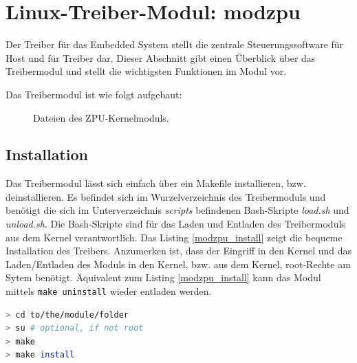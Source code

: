 \documentclass[11pt]{scrartcl}
\begin{document}
\pagebreak
\section{Linux-Treiber-Modul: modzpu}
Der Treiber für das Embedded System stellt die zentrale Steuerungssoftware für Host und für Treiber dar. Dieser Abschnitt gibt einen Überblick über das Treibermodul und stellt die wichtigsten Funktionen im Modul vor. 

Das Treibermodul ist wie folgt aufgebaut:

\begin{figure}[H]
\begin{center}
\end{center}
\caption{Dateien des ZPU-Kernelmoduls.}
\end{figure}

\subsection{Installation}

Das Treibermodul lässt sich einfach über ein Makefile installieren, bzw. deinstallieren. Es befindet sich im Wurzelverzeichnis des Treibermoduls und benötigt die sich im Unterverzeichnis  \textit{scripts} befindenen Bash-Skripte \textit{load.sh} und \textit{unload.sh}. Die Bash-Skripte sind für das Laden und Entladen des Treibermoduls aus dem Kernel verantwortlich.
Das Listing \ref{modzpu_install} zeigt die bequeme Installation des Treibers. Anzumerken ist, dass der Eingriff in den Kernel und das Laden/Entladen des Moduls in den Kernel, bzw. aus dem Kernel, root-Rechte am Sytem benötigt. Äquivalent zum Listing \ref{modzpu_install} kann das Modul mittels \texttt{make uninstall} wieder entladen werden. 

\begin{lstlisting}[label=modzpu_install,language=bash, caption=Installation des Treibermoduls]
> cd to/the/module/folder
> su # optional, if not root
> make
> make install
\end{lstlisting}
\end{document}
